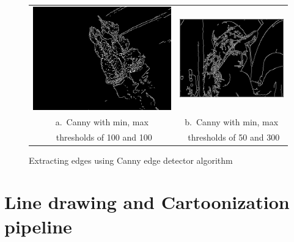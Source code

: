 \documentclass[]{IEEEtran}
\begin{document}
  \begin{figure}[tb]
      \centering
      \begin{tabular}{c c}
      \includegraphics[width=0.35\linewidth]{./figures/3/lake-3-2-1-1-canny.jpg} &
      \includegraphics[width=0.35\linewidth]{./figures/3/lena-3-2-1-2-canny.jpg} \\
      a.~Canny with min, max & b.~Canny with min, max\\
      ~thresholds of 100 and 100 & ~thresholds of 50 and 300\\
      \end{tabular}
      \caption{Extracting edges using Canny edge detector algorithm}
      \label{figure:edge2}
    \end{figure}
  
  \section{Line drawing and Cartoonization pipeline}

\end{document}
